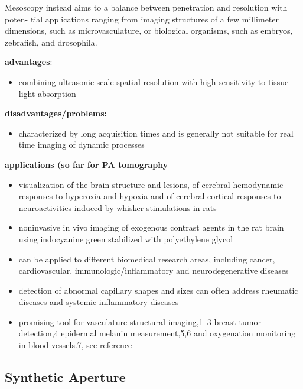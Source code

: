 Mesoscopy instead aims to a balance between penetration and resolution with poten- tial applications ranging from imaging structures of a few millimeter dimensions, such as microvasculature, or biological organisms, such as embryos, zebrafish, and drosophila.\cite{2013_Omar_Rasterscanoptoacoustic}  

\textbf{advantages}:
\begin{itemize}
	\item combining ultrasonic-scale spatial resolution with high sensitivity to tissue light absorption
\end{itemize}

\textbf{disadvantages/problems:}
\begin{itemize}
	\item characterized by long acquisition times and is generally not suitable for real time imaging of dynamic processes
\end{itemize}

\textbf{applications (so far for PA tomography}
\begin{itemize}
	\item visualization of the brain structure and lesions, of cerebral hemodynamic responses to hyperoxia and hypoxia and of cerebral cortical responses to neuroactivities induced by whisker stimulations in rats \cite{2003_Wang_Noninvasivelaserinduced}
	\item noninvasive in vivo imaging of exogenous contrast agents in the rat brain using indocyanine green stabilized with polyethylene glycol \cite{2004_Wang_Noninvasivephotoacousticangiography} 
	\item can be applied to different biomedical research areas, including cancer, cardiovascular, immunologic/inflammatory and neurodegenerative diseases
	\item detection of abnormal capillary shapes and sizes can often address rheumatic diseases and systemic inflammatory diseases \cite{2001_ScusselLonzetti_UpdatingAmericanCollege,2006_Cutolo_Nailfoldcapillaroscopyis}
	\item promising tool for vasculature structural imaging,1–3 breast tumor detection,4 epidermal melanin measurement,5,6 and oxygenation monitoring in blood vessels.7, see reference \cite{2006_Li_Improvedinvivo}
\end{itemize}

\subsection{Synthetic Aperture}
\label{sec:SyntheticAperture} 


\cite{2012_Ma_Fastscanningcoaxial} 


 












